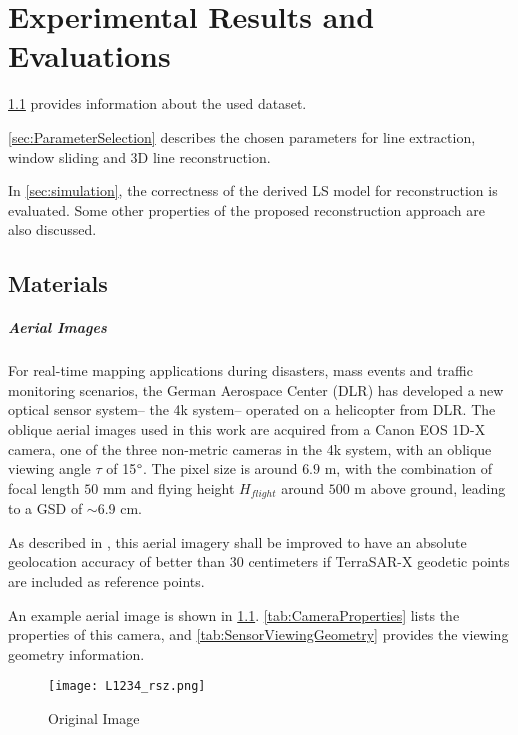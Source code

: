 \chapter{Experimental Results and Evaluations}
\label{chap:k3}

\cref{sec:Materials} provides information about the used dataset. 

\cref{sec:ParameterSelection} describes the chosen parameters for line extraction, window sliding and 3D line reconstruction. 

In \cref{sec:simulation}, the correctness of the derived LS model for reconstruction is evaluated. Some other properties of the proposed reconstruction approach are also discussed.


\clearpage
\section{Materials}
\label{sec:Materials}

\paragraph{Aerial Images}
For real-time mapping applications during disasters, mass events and traffic monitoring scenarios, the German Aerospace Center (DLR) has developed a new optical sensor system-- the 4k system-- operated on a helicopter from DLR. The oblique aerial images used in this work are acquired from a Canon EOS 1D-X camera, one of the three non-metric cameras in the 4k system, with an oblique viewing angle $\tau$ of 15$\degree$. The pixel size is around $6.9$ \textmu m, with the combination of focal length $50$ mm and flying height $H_{flight}$ around $500$ m above ground, leading to a GSD of $\sim$6.9 cm.

As described in \cite{Fischer2017}, this aerial imagery shall be improved to have an absolute geolocation accuracy of better than 30 centimeters if TerraSAR-X geodetic points are included as reference points.

An example aerial image is shown in \cref{fig:OriImg}. \cref{tab:CameraProperties} lists the properties of this camera, and \cref{tab:SensorViewingGeometry} provides the viewing geometry information.
\begin{figure}
	\centering
	\texttt{[image: L1234\_rsz.png]}
	\caption{\small Original Image}
	\label{fig:OriImg}
\end{figure}

